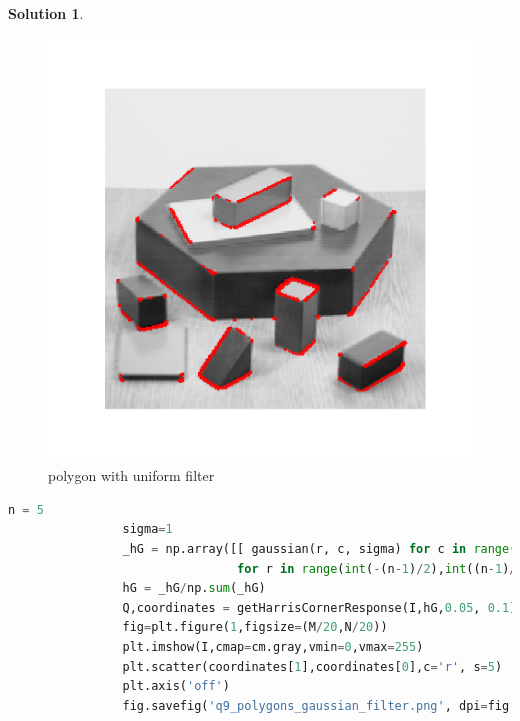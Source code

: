 \documentclass[11pt]{article}
\theoremstyle{plain}
\theoremstyle{definition}
\newtheorem{solution}{Solution}
\theoremstyle{remark}
\begin{document}
\begin{solution}
\begin{enumerate}
			\begin{figure}[h]
				\centering
				\includegraphics[width=\textwidth]{q9_polygons_uniform_filter.png}
				\caption{polygon with uniform filter}
			\end{figure}
			
			\begin{lstlisting}[language=Python, caption=polygon with gaussian filter]
				n = 5
				sigma=1
				_hG = np.array([[ gaussian(r, c, sigma) for c in range(int(-(n-1)/2),int((n-1)/2 + 1))] 
				                for r in range(int(-(n-1)/2),int((n-1)/2 + 1))])
				hG = _hG/np.sum(_hG)
				Q,coordinates = getHarrisCornerResponse(I,hG,0.05, 0.1)
				fig=plt.figure(1,figsize=(M/20,N/20))
				plt.imshow(I,cmap=cm.gray,vmin=0,vmax=255)
				plt.scatter(coordinates[1],coordinates[0],c='r', s=5)
				plt.axis('off')
				fig.savefig('q9_polygons_gaussian_filter.png', dpi=fig.dpi)
			\end{lstlisting}
			

\end{enumerate}
\end{solution}
\end{document}
